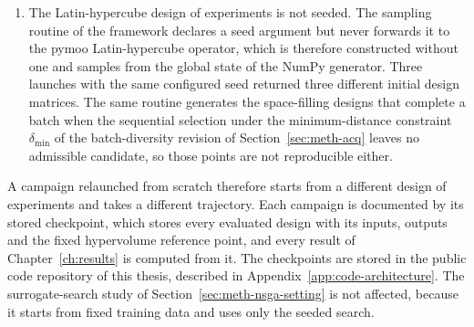 \begin{itemize}
\begin{enumerate}
          \item The Latin-hypercube design of experiments is not
                seeded. The sampling routine of the framework declares a
                seed argument but never forwards it to the pymoo
                Latin-hypercube operator, which is therefore constructed
                without one and samples from the global state of the
                NumPy generator. Three launches with the same configured
                seed returned three different initial design matrices.
                The same routine generates the space-filling designs
                that complete a batch when the sequential selection
                under the minimum-distance constraint
                $\delta_\mathrm{min}$ of the batch-diversity revision
                of Section~\ref{sec:meth-acq} leaves no admissible candidate,
                so those points are not reproducible either.
        \end{enumerate}

        A campaign relaunched from scratch therefore starts from a
        different design of experiments and takes a different
        trajectory. Each campaign is documented by its stored checkpoint, which stores every evaluated design with its inputs,
        outputs and the fixed hypervolume reference point, and every
        result of Chapter~\ref{ch:results} is computed from it. The
        checkpoints are stored in the public code repository of this
        thesis, described in
        Appendix~\ref{app:code-architecture}. The
        surrogate-search study of Section~\ref{sec:meth-nsga-setting} is
        not affected, because it starts from fixed training data and uses
        only the seeded search.
\end{itemize}

